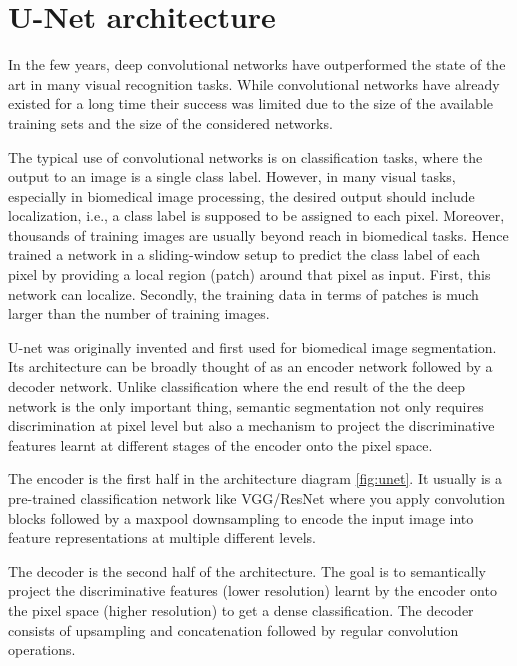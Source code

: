 \chapter{U-Net architecture}
\label{ch:u_net_architecture}

In the few years, deep convolutional networks have outperformed the state of the art in many visual recognition tasks. While convolutional networks have already existed for a long time their success was limited due to the size of the available training sets and the size of the considered networks.

The typical use of convolutional networks is on classification tasks, where the output to an image is a single class label. However, in many visual tasks, especially in biomedical image processing, the desired output should include localization, i.e., a class label is supposed to be assigned to each pixel. Moreover, thousands of training images are usually beyond reach in biomedical tasks. Hence trained a network in a sliding-window setup to predict the class label of each pixel by providing a local region (patch) around that pixel as input. First, this network can localize. Secondly, the training data in terms of patches is much larger than the number of training images.

U-net was originally invented and first used for biomedical image segmentation. Its architecture can be broadly thought of as an encoder network followed by a decoder network. Unlike classification where the end result of the the deep network is the only important thing, semantic segmentation not only requires discrimination at pixel level but also a mechanism to project the discriminative features learnt at different stages of the encoder onto the pixel space. 


The encoder is the first half in the architecture diagram \ref{fig:unet}. It usually is a pre-trained classification network like VGG/ResNet where you apply convolution blocks followed by a maxpool downsampling to encode the input image into feature representations at multiple different levels.

The decoder is the second half of the architecture. The goal is to semantically project the discriminative features (lower resolution) learnt by the encoder onto the pixel space (higher resolution) to get a dense classification. The decoder consists of upsampling and concatenation followed by regular convolution operations.

